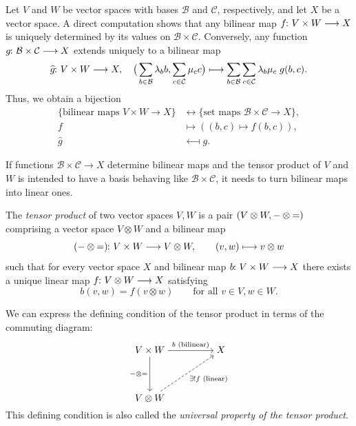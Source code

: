 \documentclass[a4paper, oneside, 12pt]{amsart}
\begin{document}
\begin{remark}\label{rmk:bilinear-uniquely-def-by-values-on-basis}
  Let \( V \) and \( W \) be vector spaces with bases \( \mathcal{B} \) and \( \mathcal{C} \), respectively, and let \( X \) be a vector space.
  A direct computation shows that any bilinear map \(f\from V\times W \to X\) is uniquely determined by its values on \(\mathcal{B}\times \mathcal{C}\).
  Conversely, any function \( g \from \mathcal{B} \times \mathcal{C} \to X \) extends uniquely to a bilinear map
  \begin{equation*}
    \widehat{g} \from V \times W \to X, \quad \big(\sum_{b\in \mathcal{B}}\lambda_{b} b, \sum_{c \in \mathcal{C}} \mu_{c}c\big) \mapsto \sum_{b\in \mathcal{B}} \sum_{c\in \mathcal{C}} \lambda_{b} \mu_{c}\; g(b,c).
  \end{equation*}
  Thus, we obtain a bijection
  \begin{align*}
    \{ \text{bilinear maps } V \times W \to X \} &\longleftrightarrow \{ \text{set maps } \mathcal{B} \times \mathcal{C} \to X \}, \\
    f &\mapsto \left( (b, c) \mapsto f(b, c) \right), \\
    \widehat{g} &\longmapsfrom g.
  \end{align*}
\end{remark}
If functions \(\mathcal{B}\times \mathcal{C}\to X\) determine bilinear maps and the tensor product of \(V\) and \(W\) is intended to have a basis behaving like \(\mathcal{B}\times \mathcal{C}\), it needs to turn bilinear maps into linear ones.

\begin{definition}\label{def:tensor-product}
  The \emph{tensor product} of two vector spaces \(V, W\) is a pair \((V\otimes W, {-} \otimes {=})\) comprising a vector space \(V\otimes W\) and a bilinear map
  \begin{equation}
    (\blank \otimes \bblank)\from V \times W \to V\otimes W, \qquad (v,w) \mapsto v\otimes w
  \end{equation}
  such that for every vector space \(X\) and  bilinear map \(b \from V \times W \to X\) there exists a unique linear map \(f \from V\otimes W \to X\) satisfying
  \begin{equation}
    b(v, w) = f(v \otimes w) \qquad \text{for all } v \in V, w \in W.
  \end{equation}
\end{definition}

We can express the defining condition of the tensor product in terms of the commuting diagram:
\begin{equation*}
  \begin{tikzcd}[ampersand replacement=\&,cramped]
    {V\times W} \&\& X \\
    \\
    {V\otimes W}
    \arrow["b \text{ (bilinear)}", from=1-1, to=1-3]
    \arrow["{\blank \otimes \bblank}"', from=1-1, to=3-1]
    \arrow["{\exists! f \text{ (linear)}}"', dashed, from=3-1, to=1-3]
  \end{tikzcd}
\end{equation*}
This defining condition is also called the \emph{universal property of the tensor product}.
\bigskip
\end{document}
